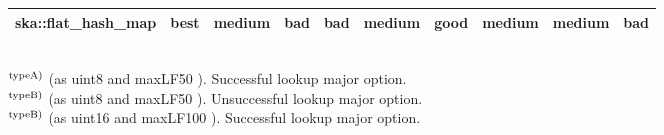 \begin{table}[hbtp]
\begin{center}
\begin{tabular}{c|c|ccc|ccc|c|c}
        ska::flat\_hash\_map                                          & best   & medium              & bad                & bad                        & medium              & good               & medium                       & medium & bad  \rule[0pt]{0pt}{15pt} \\ \hline
    \end{tabular}
    \\
    ${\rm ^{typeA)}}$ (as uint8 and maxLF50 ). Successful lookup major option.\\
    ${\rm ^{typeB)}}$ (as uint8 and maxLF50 ). Unsuccessful lookup major option.\\
    ${\rm ^{typeB)}}$ (as uint16 and maxLF100 ). Successful lookup major option.
    \label{table_hashT_cmp}
  \end{center}
\end{table}







